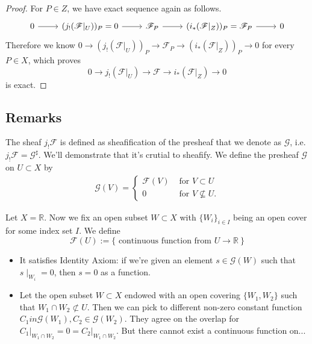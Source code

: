 \begin{proof}
For $P\in Z$, we have exact sequence again as follows.
\[\begin{tikzcd}
	0 & {(j_!(\mathscr F\vert_U))_P=0} & {\mathscr F_P} & {(i_{\ast}(\mathscr F\vert_Z))_P=\mathscr F_P} & 0
	\arrow[from=1-1, to=1-2]
	\arrow[from=1-2, to=1-3]
	\arrow[from=1-3, to=1-4]
	\arrow[from=1-4, to=1-5]
\end{tikzcd}\]
Therefore we know $0\to (j_!(\mathscr F\vert_U))_P\to \mathscr F_P\to (i_{\ast}(\mathscr F\vert_Z))_P\to 0$ for every $P\in X$, which proves 
\[0\to j_!(\mathscr F\vert_U)\to \mathscr F\to i_{\ast}(\mathscr F\vert_Z)\to 0\] is exact.
\end{proof}

\subsection{Remarks}

The sheaf $j_{!}\mathscr F$ is defined as sheafification of the presheaf that we denote as $\mathscr G$, i.e. $j_{!}\mathscr F=\mathscr G^{\sharp}$. We'll demonstrate that it's crutial to sheafify. We define the presheaf $\mathscr G$ on $U\subset X$ by 
\begin{align*}
    \mathscr G(V)=\begin{cases}
        \mathscr F(V) & \text{ for } V\subset U \\
        0 & \text{ for } V\not\subseteq U.
    \end{cases}
\end{align*}

Let $X=\mathbb R$. 
Now we fix an open subset $W\subset X$ with $\{W_i\}_{i\in I}$ being an open cover for some index set $I$. We define 
\[\mathscr F(U):=\{\text{ continuous function from } U\to \mathbb R~\}\]

\begin{itemize}
    \item It satisfies Identity Axiom: if we're given an element $s\in \mathscr G(W)$ such that $s\mid_{W_i}=0$, then $s=0$ as a function.
    \item Let the open subset $W\subset X$ endowed with an open covering $\{W_1,W_2\}$ such that $W_1\cap W_2\not\subset U$. Then we can pick to different non-zero constant function $C_1
    in\mathscr G(W_1),C_2\in\mathscr G(W_2)$. They agree on the overlap for $C_1\vert_{W_1\cap W_2}=0=C_2\vert_{W_1\cap W_2}$. But there cannot exist a continuous function on... 
\end{itemize}

